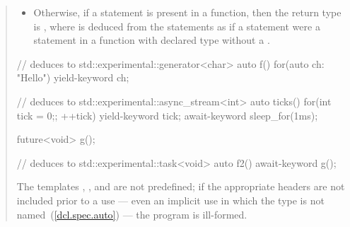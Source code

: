 \begin{quote}
\begin{itemize}

\item Otherwise, if a  statement is present in a function, then the return type is \linebreak
{},
where  is deduced from the  statements  as if a  statement were a  statement in a function with declared type  without a .

\end{itemize}
\enterexample
\begin{codeblock}
// deduces to std::experimental::generator<char>
auto f() { for(auto ch: "Hello") yield-keyword ch; }

// deduces to std::experimental::async_stream<int>
auto ticks() {
  for(int tick = 0;; ++tick) {
    yield-keyword tick;
    await-keyword sleep_for(1ms);
  }
}

future<void> g();

// deduces to std::experimental::task<void>
auto f2() {  await-keyword g(); }

\end{codeblock}
\exitexample

\pnum
The templates  , 
, and \linebreak
{} are not predefined;
if the appropriate headers are not included prior to a use --- even an implicit use in which the type is not
named~(\ref{dcl.spec.auto}) --- the program is ill-formed.
\end{quote}
